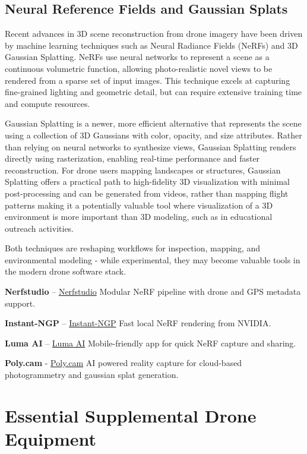 \documentclass[
  12pt,
]{book}
\begin{document}
\subsection{Neural Reference Fields and Gaussian Splats}\label{neural-reference-fields-and-gaussian-splats}

Recent advances in 3D scene reconstruction from drone imagery have been driven by machine learning techniques such as Neural Radiance Fields (NeRFs) and 3D Gaussian Splatting. NeRFs use neural networks to represent a scene as a continuous volumetric function, allowing photo-realistic novel views to be rendered from a sparse set of input images. This technique excels at capturing fine-grained lighting and geometric detail, but can require extensive training time and compute resources.

Gaussian Splatting is a newer, more efficient alternative that represents the scene using a collection of 3D Gaussians with color, opacity, and size attributes. Rather than relying on neural networks to synthesize views, Gaussian Splatting renders directly using rasterization, enabling real-time performance and faster reconstruction. For drone users mapping landscapes or structures, Gaussian Splatting offers a practical path to high-fidelity 3D visualization with minimal post-processing and can be generated from videos, rather than mapping flight patterns making it a potentially valuable tool where visualization of a 3D environment is more important than 3D modeling, such as in educational outreach activities.

Both techniques are reshaping workflows for inspection, mapping, and environmental modeling - while experimental, they may become valuable tools in the modern drone software stack.

\textbf{Nerfstudio} -- \href{https://docs.nerf.studio/}{Nerfstudio} Modular NeRF pipeline with drone and GPS metadata support.

\textbf{Instant-NGP} -- \href{https://github.com/NVlabs/instant-ngp}{Instant-NGP} Fast local NeRF rendering from NVIDIA.

\textbf{Luma AI} -- \href{https://lumalabs.ai/}{Luma AI} Mobile-friendly app for quick NeRF capture and sharing.

\textbf{Poly.cam} - \href{https://poly.cam/}{Poly.cam} AI powered reality capture for cloud-based photogrammetry and gaussian splat generation.

\section{Essential Supplemental Drone Equipment}\label{essential-supplemental-drone-equipment}
\end{document}

